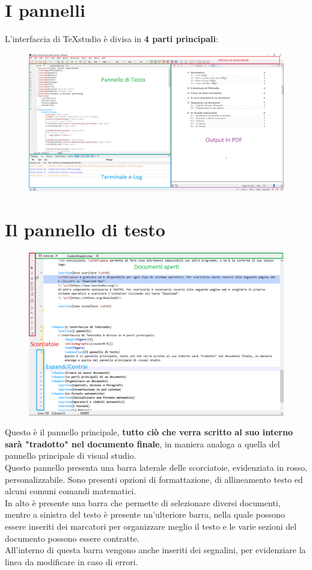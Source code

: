 \documentclass[12pt, oneside, openany, a4paper]{book}
\begin{document}
		\section{I pannelli}
		L'interfaccia di TeXstudio è divisa in \textbf{4 parti principali}:
			\begin{figure}[h]
				\includegraphics[width=\textwidth]{Chap2/FullTEX.png}
			\end{figure}
	\newpage
	
		\section{Il pannello di testo}
			\begin{figure}[h]
				\includegraphics[width=\textwidth]{Chap2/MainPanel.png}
			\end{figure}
		\noindent Questo è il pannello principale, \textbf{tutto ciò che verra scritto al suo interno sarà "tradotto" nel documento finale}, in maniera analoga a quella del pannello principale di visual studio.\\
		Questo pannello presenta una barra laterale delle scorciatoie, evidenziata in rosso, personalizzabile. Sono presenti opzioni di formattazione, di allineamento testo ed alcuni comuni comandi matematici.\\
		In alto è presente una barra che permette di selezionare diversi documenti, mentre a sinistra del testo è presente un'ulteriore barra, nella quale possono essere inseriti dei marcatori per organizzare meglio il testo e le varie sezioni del documento possono essere contratte.\\
		All'interno di questa barra vengono anche inseriti dei segnalini, per evidenziare la linea da modificare in caso di errori.
	\newpage
	
\end{document}
